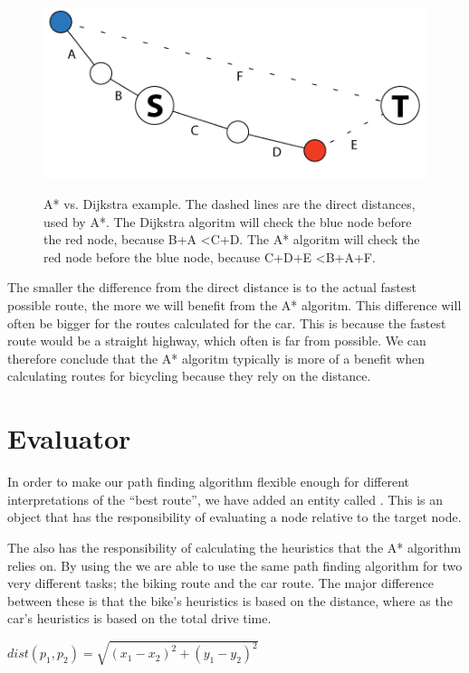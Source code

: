 \begin{figure}[!ht]
\centering
\includegraphics[width=1\linewidth]{images/AstarVSDijkstra.png}
\label{}
\caption{A* vs. Dijkstra example. The dashed lines are the direct distances,
used by A*. The Dijkstra algoritm will check the blue node before the red
node, because B+A \textless C+D. The A* algoritm will check the red node
before the blue node, because C+D+E \textless B+A+F.}
\end{figure}

The smaller the difference from the direct distance is to the actual fastest
possible route, the more we will benefit from the A* algoritm. This
difference will often be bigger for the routes calculated for the car. This is
because the fastest route would be a straight highway, which often is far from
possible. We can therefore conclude that the A* algoritm typically is more
of a benefit when calculating routes for bicycling because they rely on the
distance.

\section{Evaluator}
\label{IMPL-EVA}
In order to make our path finding algorithm flexible enough for different 
interpretations of the ``best route'', we have added an entity called . 
This is an object that has the responsibility of evaluating a node relative to 
the target node. 

The  also has the responsibility of calculating the 
heuristics that the A* algorithm relies on. By using the  we are able to 
use the same path finding algorithm for two very different tasks; the biking route and 
the car route. The major difference between these is that the bike's heuristics is based 
on the distance, where as the car's heuristics is based on the total drive time. 

\begin{center}
$
dist(p_{1},p_{2})=\sqrt{(x_{1}-x_{2})^{2}+(y_{1}-y_{2})^{2}}
$
\end{center}

